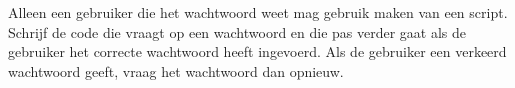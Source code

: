 Alleen een gebruiker die het wachtwoord  weet mag gebruik maken van een script. Schrijf de code die vraagt op een wachtwoord en die pas verder gaat als de gebruiker het correcte wachtwoord heeft ingevoerd. Als de gebruiker een verkeerd wachtwoord geeft, vraag het wachtwoord dan opnieuw.

